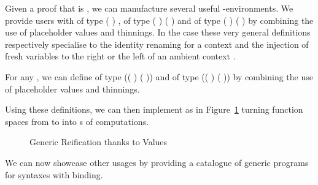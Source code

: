 \label{sec:varlike:base}
Given a proof that  is , we can manufacture
several useful -environments. We provide users with
 of type {( )  },
 of type {( )  ( \AF{++} )}
and  of type {( )  ( \AF{++} )}
by combining the use of placeholder values and thinnings.
In the  case these very general definitions respectively specialise
to the identity renaming for a context  and the injection of 
fresh variables to the right or the left of an ambient context .

For any  , we can define  of
type {(( )  ( \AF{++} ))} and  of
type {(( )  ( \AF{++} ))} by combining the use
of placeholder values and thinnings.

Using these definitions, we can then implement  as in
Figure~\ref{fig:kripkereify} turning  function spaces
from  to  into s of  computations.

\begin{figure}[h]
\caption{Generic Reification thanks to  Values\label{fig:kripkereify}}
\end{figure}

We can now showcase other usages by providing a catalogue of generic programs
for syntaxes with binding.



